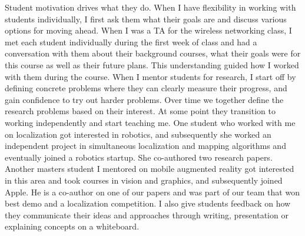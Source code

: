 \documentclass[10pt]{article}
\begin{document}

%

Student motivation drives what they do. When I have flexibility in working with students individually, I first ask them what their goals are and discuss various options for moving ahead. When I was a TA for the wireless networking class, I met each student individually during the first week of class and had a conversation with them about their background courses, what their goals were for this course as well as their future plans. This understanding guided how I worked with them during the course. When I mentor students for research, I start off by defining concrete problems where they can clearly measure their progress, and gain confidence to try out harder problems. Over time we together define the research problems based on their interest. At some point they transition to working independently and start teaching me. One student who worked with me on localization got interested in robotics, and subsequently she worked an independent project in simultaneous localization and mapping algorithms and eventually joined a robotics startup. She co-authored two research papers. Another masters student I mentored on mobile augmented reality got interested in this area and took courses in vision and graphics, and subsequently joined Apple. He is a co-author on one of our papers and was part of our team that won best demo and a localization competition. I also give students feedback on how they communicate their ideas and approaches through writing, presentation or explaining concepts on a whiteboard.
\end{document}
